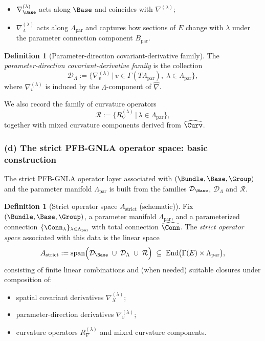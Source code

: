 \documentclass[11pt]{book}
\theoremstyle{plain}
\theoremstyle{definition}
\newtheorem{definition}[theorem]{Definition} \theoremstyle{remark}
\begin{document}
\begin{itemize}
  \item $\nabla^{(\lambda)}_{\Base}$ acts along $\Base$ and coincides
        with $\nabla^{(\lambda)}$;
  \item $\nabla^{(\lambda)}_{\Lambda}$ acts along $\Lambda_{\mathrm{par}}$
        and captures how sections of $E$ change with $\lambda$ under
        the parameter connection component $B_{\mathrm{par}}$.
\end{itemize}

\begin{definition}[Parameter-direction covariant-derivative family]
The \\ \emph{parameter-direction covariant-derivative family} is the collection
  \[
     \mathcal{D}_{\Lambda}
     :=
     \bigl\{
       \nabla^{(\lambda)}_{v}
       \,\big|\,
       v\in\Gamma(T\Lambda_{\mathrm{par}}),\;
       \lambda\in\Lambda_{\mathrm{par}}
     \bigr\},
  \]
  where $\nabla^{(\lambda)}_{v}$ is induced by the $\Lambda$-component
  of $\widehat{\nabla}$.
\end{definition}

We also record the family of curvature operators
\[
   \mathcal{R}
   :=
   \bigl\{
     R^{(\lambda)}_\nabla
     \,\big|\,
     \lambda\in\Lambda_{\mathrm{par}}
   \bigr\},
\]
together with mixed curvature components derived from $\widehat{\Curv}$.



\subsubsection*{(d) The strict PFB-GNLA operator space: basic construction}

The strict PFB-GNLA operator layer associated with
$(\Bundle,\Base,\Group)$ and the parameter manifold $\Lambda_{\mathrm{par}}$
is built from the families $\mathcal{D}_{\Base}$, $\mathcal{D}_{\Lambda}$
and $\mathcal{R}$.

\begin{definition}[Strict operator space $A_{\mathrm{strict}}$ (schematic)]
Fix $(\Bundle,\Base,\Group)$, a parameter manifold
  $\Lambda_{\mathrm{par}}$, and a parameterized connection
  $\{\Conn_\lambda\}_{\lambda\in\Lambda_{\mathrm{par}}}$ with total
  connection $\widehat{\Conn}$. The \emph{strict operator space}
  associated with this data is the linear space
  \[
     A_{\mathrm{strict}}
     :=
     \mathrm{span}\Bigl(
       \mathcal{D}_{\Base}
       \;\cup\;
       \mathcal{D}_{\Lambda}
       \;\cup\;
       \mathcal{R}
     \Bigr)
     \;\subseteq\;
     \mathrm{End}\bigl(\Gamma(E)\times\Lambda_{\mathrm{par}}\bigr),
  \]
  consisting of finite linear combinations and (when needed) suitable
  closures under composition of:
  \begin{itemize}
    \item spatial covariant derivatives $\nabla^{(\lambda)}_X$;
    \item parameter-direction derivatives $\nabla^{(\lambda)}_{v}$;
    \item curvature operators $R^{(\lambda)}_\nabla$ and mixed
          curvature components.
  \end{itemize}
\end{definition}
\end{document}
